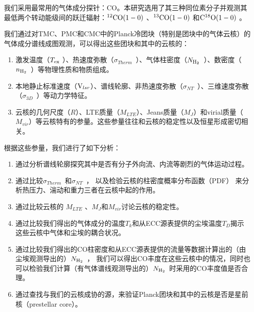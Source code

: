 \documentclass[UTF8, nocolorlinks]{pkuthss}
\newcommand{\coaa}{$\rm^{12}CO(1-0)$ }
\newcommand{\cobb}{$\rm^{13}CO(1-0)$ }
\newcommand{\cocc}{$\rm C^{18}O(1-0)$ }
\newcommand{\vlsr}{${\rm V } _{lsr}$}
\newcommand{\texc}{$T_{\rm {ex}}$ }
\newcommand{\nhyd}{$N_{\rm H_2}$\ }
\newcommand{\nnhyd}{$n_{\rm H_2}$\ }
\newcommand{\sigmath}{$\sigma _{Therm}$\ }
\newcommand{\sigmant}{$\sigma _{NT}$\ }
\newcommand{\sigmatd}{$\sigma _{3D}$\ }
\begin{document}
		我们采用最常用的气体成分探针：CO。本研究选用了其三种同位素分子并观测其最低两个转动能级间的跃迁辐射：\coaa 、\cobb  和\cocc 。

		我们通过对TMC、PMC和CMC中的Planck冷团块（特别是团块中的气体云核）的气体成分谱线成图观测，可以得出这些团块和其中的云核的：

		\begin{adjustwidth}{0.5cm}{0cm}
		\begin{enumerate}
			\item 激发温度（\texc ）、热速度弥散（\sigmath ）、气体柱密度（\nhyd ）、数密度（\nnhyd ）等物理性质和物质组成。

			\item 本地静止标准速度（\vlsr ）、谱线轮廓、非热速度弥散（\sigmant ）、三维速度弥散（\sigmatd ）等动力学特征。

			\item 云核的几何尺度（$R$）、LTE质量（$M_{LTE}$）、Jeans质量（$M_{J}$）和virial质量（$M_{vir}$）等云核特有的参量。这些参量往往和云核的稳定性以及恒星形成密切相关。
		\end{enumerate}
		\end{adjustwidth}
		
		根据这些参量，我们进行了如下分析：

		\begin{adjustwidth}{0.5cm}{0cm}
		\begin{enumerate}
			\item 通过分析谱线轮廓探究其中是否有分子外向流、内流等剧烈的气体运动过程。

			\item 通过比较\sigmath 和\sigmant ， 以及检验云核的柱密度概率分布函数（PDF） 来分析热压力、湍动和重力三者在云核中起的作用。

			\item 通过比较云核的 $M_{LTE}$ 、$M_{J}$和$M_{vir}$讨论云核的稳定性。

			\item 通过比较我们得出的气体成分的温度$T_k$和从ECC源表提供的尘埃温度$T_D$揭示这些云核中气体和尘埃的耦合状况。

			\item 通过比较我们得出的CO柱密度和从ECC源表提供的流量等数据计算出的（由尘埃观测导出的）\nhyd， 我们可以得出CO丰度在这些云核中的情况，同时也可以检验我们计算（有气体谱线观测导出的）\nhyd 时采用的CO丰度值是否合理。

			\item 通过查找与我们的云核成协的源，来验证Planck团块和其中的云核是否是星前核（prestellar core）。
		\end{enumerate}
		\end{adjustwidth}
\end{document}
